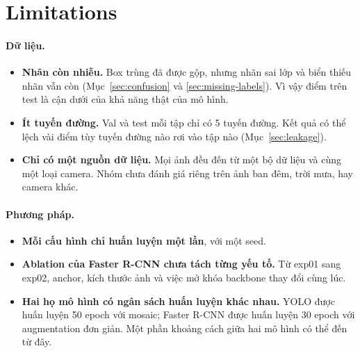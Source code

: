 
\section*{Limitations}
\label{sec:limitations}

\paragraph{Dữ liệu.}
\begin{itemize}
\item \textbf{Nhãn còn nhiễu.} Box trùng đã được gộp, nhưng nhãn sai lớp và biển thiếu nhãn vẫn còn (Mục~\ref{sec:confusion} và \ref{sec:missing-labels}). Vì vậy điểm trên test là cận dưới của khả năng thật của mô hình.
\item \textbf{Ít tuyến đường.} Val và test mỗi tập chỉ có 5 tuyến đường. Kết quả có thể lệch vài điểm tùy tuyến đường nào rơi vào tập nào (Mục~\ref{sec:leakage}).
\item \textbf{Chỉ có một nguồn dữ liệu.} Mọi ảnh đều đến từ một bộ dữ liệu và cùng một loại camera. Nhóm chưa đánh giá riêng trên ảnh ban đêm, trời mưa, hay camera khác.
\end{itemize}

\paragraph{Phương pháp.}
\begin{itemize}
\item \textbf{Mỗi cấu hình chỉ huấn luyện một lần}, với một seed.
\item \textbf{Ablation của Faster R-CNN chưa tách từng yếu tố.} Từ exp01 sang exp02, anchor, kích thước ảnh và việc mở khóa backbone thay đổi cùng lúc.
\item \textbf{Hai họ mô hình có ngân sách huấn luyện khác nhau.} YOLO được huấn luyện 50 epoch với mosaic; Faster R-CNN được huấn luyện 30 epoch với augmentation đơn giản. Một phần khoảng cách giữa hai mô hình có thể đến từ đây.
\end{itemize}

